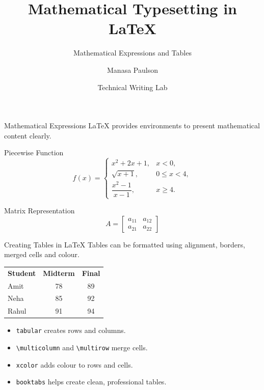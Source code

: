 \documentclass[aspectratio=169]{beamer}
\title{Mathematical Typesetting in LaTeX}
\subtitle{Mathematical Expressions and Tables}
\author{Manasa Paulson}
\institute{MNIT Jaipur}
\date{Technical Writing Lab}
\begin{document}
	
	\begin{frame}
		\titlepage
	\end{frame}
	
	\begin{frame}{Mathematical Expressions}
		LaTeX provides environments to present mathematical content clearly.
		
		\vspace{0.3cm}
		\begin{block}{Piecewise Function}
			\[
			f(x)=\begin{cases}
				x^2+2x+1, & x<0,\\
				\sqrt{x+1}, & 0\leq x<4,\\
				\dfrac{x^2-1}{x-1}, & x\geq 4.
			\end{cases}
			\]
		\end{block}
		
		\begin{block}{Matrix Representation}
			\[
			A=\begin{bmatrix}
				a_{11} & a_{12}\\
				a_{21} & a_{22}
			\end{bmatrix}
			\]
		\end{block}
	\end{frame}
	
	\begin{frame}{Creating Tables in LaTeX}
		Tables can be formatted using alignment, borders, merged cells and colour.
		
		\vspace{0.25cm}
		\begin{center}
			\rowcolors{2}{blue!8}{white}
			\begin{tabular}{lcc}
				\rowcolor{blue!25}
				\textbf{Student} & \textbf{Midterm} & \textbf{Final}\\
				Amit & 78 & 89\\
				Neha & 85 & 92\\
				Rahul & 91 & 94\\
			\end{tabular}
		\end{center}
		
		\vspace{0.25cm}
		\begin{itemize}
			\item \texttt{tabular} creates rows and columns.
			\item \texttt{\textbackslash multicolumn} and \texttt{\textbackslash multirow} merge cells.
			\item \texttt{xcolor} adds colour to rows and cells.
			\item \texttt{booktabs} helps create clean, professional tables.
		\end{itemize}
	\end{frame}
	
\end{document}
